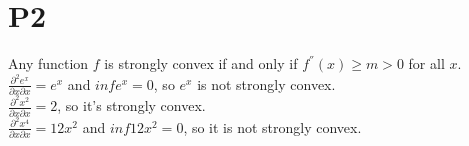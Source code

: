 \documentclass{article}
\newcommand{\pp}[3]{\frac{{\partial}^2 #1}{\partial #2 \partial #3}}
\begin{document}
\section{P2}

Any function $f$ is strongly convex if and only if $f^{''}(x) \ge m > 0$ for all $x$. \\

$\pp{e^x}{x}{x} = e^x$ and $inf e^x = 0$, so $e^x$ is not strongly convex. \\

$\pp{x^2}{x}{x} = 2$, so it's strongly convex. \\

$\pp{x^4}{x}{x} = 12x^2$ and $inf 12x^2 = 0$, so it is not strongly convex.
\end{document}

